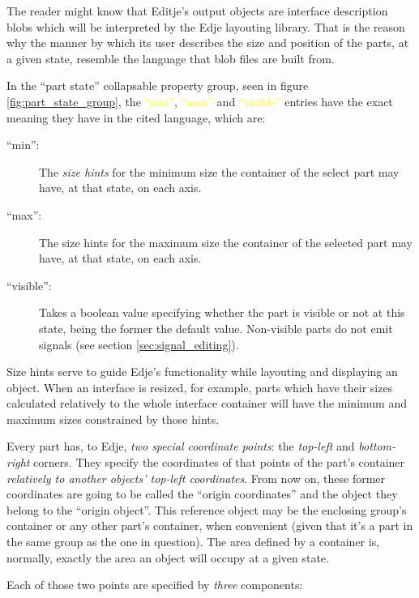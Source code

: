 \documentclass[a4paper]{profusion}
\newcommand{\GUIEditable}[1]{\textcolor{yellow}{#1}} %
\begin{document}
The reader might know that Editje's output objects are interface
description blobs which will be interpreted by the Edje layouting
library. That is the reason why the manner by which its user describes
the size and position of the parts, at a given state, resemble the
language that blob files are built from.

In the ``part state'' collapsable property group, seen in figure
\ref{fig:part_state_group}, the \GUIEditable{``min''},
\GUIEditable{``max''} and \GUIEditable{``visible''} entries have the
exact meaning they have in the cited language, which are:

\begin{description}
\item[``min'':] The \emph{size hints} for the minimum size the
  container of the select part may have, at that state, on each axis.

\item[``max'':] The size hints for the maximum size the container of
  the selected part may have, at that state, on each axis.

\item[``visible'':] Takes a boolean value specifying whether the part
  is visible or not at this state, being the former the default
  value. Non-visible parts do not emit signals (see section
  \ref{sec:signal_editing}).
\end{description}

Size hints serve to guide Edje's functionality while layouting and
displaying an object. When an interface is resized, for example, parts
which have their sizes calculated relatively to the whole interface
container will have the minimum and maximum sizes constrained by those
hints.

Every part has, to Edje, \emph{two special coordinate points}: the
\emph{top-left} and \emph{bottom-right} corners. They specify the
coordinates of that points of the part's container \emph{relatively to
  another objects' top-left coordinates}. From now on, these former
coordinates are going to be called the ``origin coordinates'' and the
object they belong to the ``origin object''. This reference object may
be the enclosing group's container or any other part's container, when
convenient (given that it's a part in the same group as the one in
question). The area defined by a container is, normally, exactly the
area an object will occupy at a given state.

Each of those two points are specified by \emph{three} components:
\end{document}
